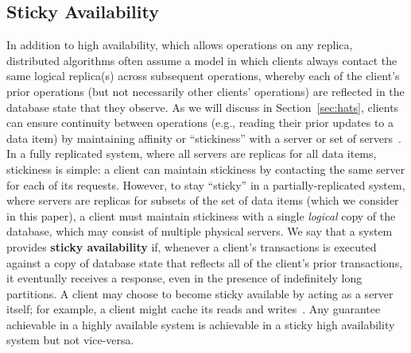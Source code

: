 \subsection{Sticky Availability}
\label{sec:sticky}

In addition to high availability, which allows operations on any
replica, distributed algorithms often assume a model in which clients
always contact the same logical replica(s) across subsequent
operations, whereby each of the client's prior operations (but not
necessarily other clients' operations) are reflected in the database
state that they observe. As we will discuss in Section~\ref{sec:hats},
clients can ensure continuity between operations (e.g., reading their
prior updates to a data item) by maintaining affinity or
``stickiness'' with a server or set of servers~\cite{vogels-defs}. In
a fully replicated system, where all servers are replicas for all data
items, stickiness is simple: a client can maintain stickiness by
contacting the same server for each of its requests. However, to stay
``sticky'' in a partially-replicated system, where servers are
replicas for subsets of the set of data items (which we consider in
this paper), a client must maintain stickiness with a single
\textit{logical} copy of the database, which may consist of multiple
physical servers. We say that a system provides \textbf{sticky
  availability} if, whenever a client's transactions is executed
against a copy of database state that reflects all of the client's prior
transactions, it eventually receives a response, even in the presence
of indefinitely long partitions. A client may choose to become sticky
available by acting as a server itself; for example, a client might
cache its reads and writes~\cite{bolton, sessionguarantees,
  swift}. Any guarantee achievable in a highly available system is
achievable in a sticky high availability system but not vice-versa.


